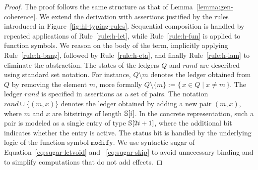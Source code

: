 \begin{proof}
The proof follows the same structure as that of Lemma~\ref{lemma:gen-coherence}. We extend the derivation with assertions justified by the rules introduced in Figure~\ref{fig:hl-typing-rules}. Sequential composition is handled by repeated applications of Rule~\ref{rule:h-let}, while Rule~\ref{rule:h-fun} is applied to function symbols. We reason on the body of the term, implicitly applying Rule~\ref{rule:h-bang}, followed by Rule~\ref{rule:h-eta}, and finally Rule~\ref{rule:h-lam} to eliminate the abstraction. The states of the ledgers $Q$ and $rand$ are described using standard set notation. For instance, $Q \setminus m$ denotes the ledger obtained from $Q$ by removing the element $m$, more formally $Q\setminus\{m\} := \{\, x\in Q \mid x\not= m \,\}$. The ledger $rand$ is specified in assertions as a set of pairs. The notation $rand \cup \{(m,x)\}$ denotes the ledger obtained by adding a new pair $(m,x)$, where $m$ and $x$ are bitstrings of length $\mathbb{S}[i]$. In the concrete representation, such a pair is modeled as a single entry of type $\mathbb{S}[2i+1]$, where the additional bit indicates whether the entry is active. The status bit is handled by the underlying logic of the function symbol $\mathtt{modify}$. We use syntactic sugar of Equation~\ref{eq:sugar-letvoid} and ~\ref{eq:sugar-skip} to avoid unnecessary binding and to simplify computations that do not add effects.


\end{proof}
